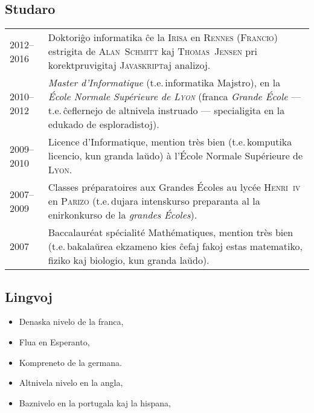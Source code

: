 \documentclass[12pt,a4paper]{article}
\makeatletter
\newcommand{\fr}[1]{\foreignlanguage{french}{\textit{#1}}}
\newcommand{\ie}{t.e.\,}
\newenvironment{datecvsection}[1]%
               {\subsection*{#1}%
                 \noindent \begin{tabular}{@{}p{\annee}p{\texte}@{}}}
               {\end{tabular}}
\newenvironment{cvsection}[1]%
               {\subsection*{#1}}
               {}
\makeatother
\begin{document}
\begin{datecvsection}{Studaro}

    2012–2016 & Doktoriĝo informatika ĉe la \textsc{Irisa} en \textsc{Rennes} (\textsc{Francio}) estrigita de \textsc{Alan~Schmitt} kaj \textsc{Thomas~Jensen} pri korektpruvigitaj \textsc{Javaskript}aj analizoj. \\

	2010–2012 & \fr{Master d’Informatique} (\ie informatika Majstro), en la \fr{École Normale Supérieure de \textsc{Lyon}} (franca \fr{Grande École} — \ie ĉeflernejo de altnivela instruado — specialigita en la edukado de esploradistoj). \\

    2009–2010 & Licence d’Informatique, mention très bien (\ie komputika licencio, kun granda laŭdo) à l’École Normale Supérieure de \textsc{Lyon}. \\

    2007–2009 & Classes préparatoires aux Grandes Écoles au lycée \textsc{Henri~iv} en \textsc{Parizo} (\ie dujara intenskurso preparanta al la enirkonkurso de la \fr{grandes Écoles}). \\

    2007 & Baccalauréat spécialité Mathématiques, mention très bien (\ie bakalaŭrea ekzameno kies ĉefaj fakoj estas matematiko, fiziko kaj biologio, kun granda laŭdo). \\

\end{datecvsection}

\begin{cvsection}{Lingvoj}
\parbox{.4\textwidth}{
\begin{itemize}
   \item Denaska nivelo de la franca,
   \item Flua en Esperanto,
   \item Kompreneto de la germana.
\end{itemize}}
\parbox{.55\textwidth}{
\begin{itemize}
   \item Altnivela nivelo en la angla,
   \item Baznivelo en la portugala kaj la hispana,
\end{itemize}}
\end{cvsection}
\end{document}
